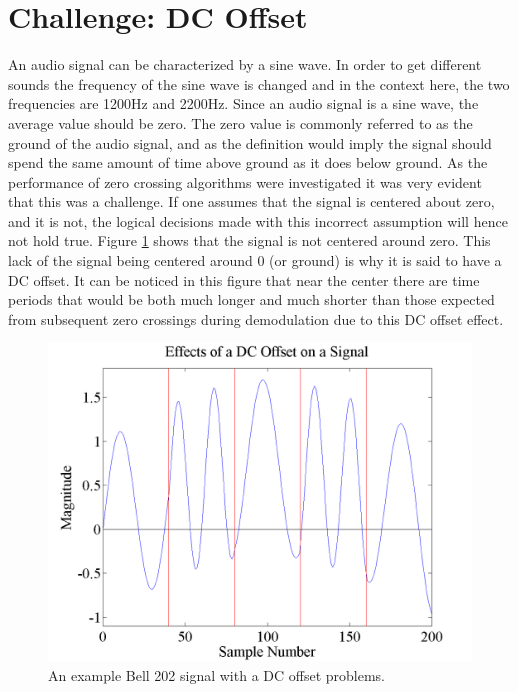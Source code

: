 \section{Challenge: DC Offset}
An audio signal can be characterized by a sine wave. In order to get different sounds the frequency of the sine wave is changed and in the context here, the two frequencies are 1200Hz and 2200Hz. Since an audio signal is a sine wave, the average value should be zero. The zero value is commonly referred to as the ground of the audio signal, and as the definition would imply the signal should spend the same amount of time above ground as it does below ground. As the performance of zero crossing algorithms were investigated it was very evident that this was a challenge. If one assumes that the signal is centered about zero, and it is not, the logical decisions made with this incorrect assumption will hence not hold true. Figure \ref{DCOffsetExample} shows that the signal is not centered around zero. This lack of the signal being centered around 0 (or ground) is why it is said to have a DC offset. It can be noticed in this figure that near the center there are time periods that would be both much longer and much shorter than those expected from subsequent zero crossings during demodulation due to this DC offset effect.
\begin{figure}
  \centering
	\includegraphics[width=0.75\linewidth]{images/EffectsofaDCOffsetonaSignal.png} 
	\caption{An example Bell 202 signal with a DC offset problems.}
   \label{DCOffsetExample}
\end{figure}

